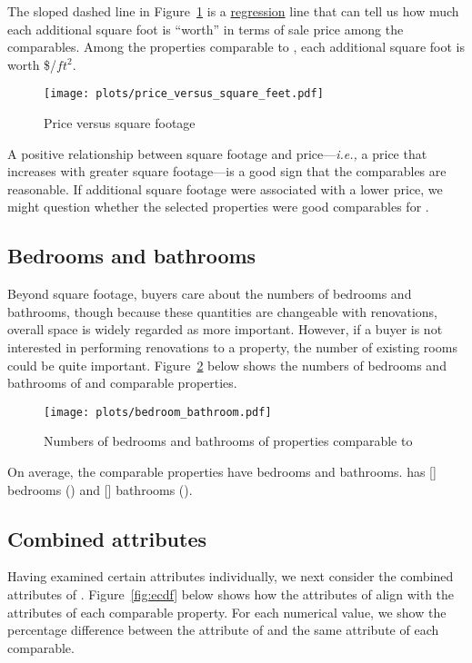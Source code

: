 \documentclass[
12pt, %
letterpaper, %
oneside, %
headinclude,footinclude, %
BCOR5mm, %
]{scrartcl}
\begin{document}
The sloped dashed line in Figure~\ref{fig:price_versus_square_feet} is a \href{https://en.wikipedia.org/wiki/Linear_regression}{regression} line that can tell us how much each additional square foot is ``worth'' in terms of sale price among the comparables.
Among the properties comparable to \PropertyName{}, each additional square foot is worth \$\MarginalPricePerFoot{}/$ft^2$. 

\begin{figure}
\centering
\caption{Price versus square footage} \label{fig:price_versus_square_feet}  
\texttt{[image: plots/price\_versus\_square\_feet.pdf]} 
\end{figure}

A positive relationship between square footage and price---\textit{i.e.,} a price that increases with greater square footage---is a good sign that the comparables are reasonable. If additional square footage were associated with a lower price, we might question whether the selected properties were good comparables for \PropertyName{}. 

\subsection{Bedrooms and bathrooms}
Beyond square footage, buyers care about the numbers of bedrooms and bathrooms, though because these quantities are changeable with renovations, overall space is widely regarded as more important.
However, if a buyer is not interested in performing renovations to a property, the number of existing rooms could be quite important.
Figure~\ref{fig:bedroom_bathroom} below shows the numbers of bedrooms and bathrooms of \PropertyName{} and comparable properties. 

\begin{figure}
\centering
\caption{Numbers of bedrooms and bathrooms of properties comparable to \PropertyName{}} \label{fig:bedroom_bathroom}  
\texttt{[image: plots/bedroom\_bathroom.pdf]} 
\end{figure}

On average, the comparable properties have \AverageBedrooms{} bedrooms and \AverageBaths{} bathrooms. \PropertyName{} has [] bedrooms (\NumberOfBedrooms{}) and [] bathrooms (\NumberOfBaths{}).

\subsection{Combined attributes}
Having examined certain attributes individually, we next consider the combined attributes of \PropertyName{}.
Figure~\ref{fig:ecdf} below shows how the attributes of \PropertyName{} align with the attributes of each comparable property.
For each numerical value, we show the percentage difference between the attribute of \PropertyName{} and the same attribute of each comparable.
\end{document}
